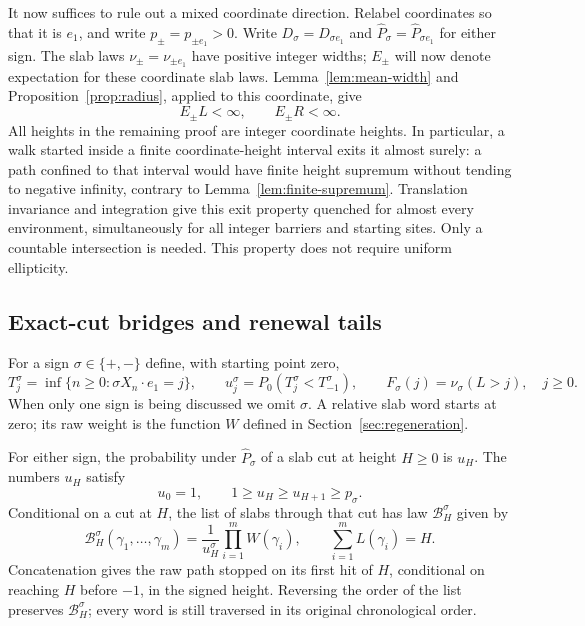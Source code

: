 It now suffices to rule out a mixed coordinate direction.  Relabel
coordinates so that it is $e_1$, and write $p_\pm=p_{\pm e_1}>0$.
Write $D_\sigma=D_{\sigma e_1}$ and
$\widehat P_\sigma=\widehat P_{\sigma e_1}$ for either sign.
The slab laws $\nu_\pm=\nu_{\pm e_1}$ have positive integer widths;
$E_\pm$ will now denote expectation for these coordinate slab laws.
Lemma~\ref{lem:mean-width} and Proposition~\ref{prop:radius},
applied to this coordinate, give
\begin{equation}\label{eq:coordinate-moments}
 E_\pm L<\infty,\qquad E_\pm R<\infty.
\end{equation}
All heights in the remaining proof are integer coordinate heights.
In particular, a walk started inside a finite coordinate-height
interval exits it almost surely: a path confined to that interval
would have finite height supremum without tending to negative
infinity, contrary to Lemma~\ref{lem:finite-supremum}.
Translation invariance and integration give this exit property
quenched for almost every environment, simultaneously for all
integer barriers and starting sites.  Only a countable intersection
is needed.  This property does not require uniform ellipticity.

\subsection{Exact-cut bridges and renewal tails}

For a sign $\sigma\in\{+,-\}$ define, with starting point zero,
\[
 T_j^\sigma=\inf\{n\ge0:\sigma X_n\cdot e_1=j\},\qquad
 u_j^\sigma=P_0(T_j^\sigma<T_{-1}^\sigma),\qquad
 F_\sigma(j)=\nu_\sigma(L>j),\quad j\ge0.
\]
When only one sign is being discussed we omit $\sigma$.
A relative slab word starts at zero; its raw weight is the function
$W$ defined in Section~\ref{sec:regeneration}.

\begin{lemma}\label{lem:exact-bridge}
For either sign, the probability under $\widehat P_\sigma$ of a
slab cut at height $H\ge0$ is $u_H$.  The numbers $u_H$ satisfy
\[
 u_0=1,\qquad 1\ge u_H\ge u_{H+1}\ge p_\sigma.
\]
Conditional on a cut at $H$, the list of slabs through that cut has
law $\mathcal B_H^\sigma$ given by
\begin{equation}\label{eq:exact-bridge-list}
 \mathcal B_H^\sigma(\gamma_1,\ldots,\gamma_m)
 =\frac{1}{u_H^\sigma}\prod_{i=1}^m W(\gamma_i),
 \qquad \sum_{i=1}^m L(\gamma_i)=H.
\end{equation}
Concatenation gives the raw path stopped on its first hit of $H$,
conditional on reaching $H$ before $-1$, in the signed height.
Reversing the order of the list preserves $\mathcal B_H^\sigma$;
every word is still traversed in its original chronological order.
\end{lemma}

